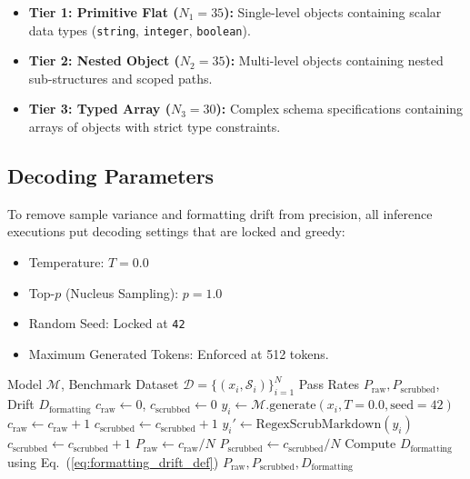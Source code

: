 \documentclass[10pt,journal,compsoc]{IEEEtran}
\begin{document}
\begin{itemize}
    \item \textbf{Tier 1: Primitive Flat ($N_1 = 35$):} Single-level objects containing scalar data types (\texttt{string}, \texttt{integer}, \texttt{boolean}).
    \item \textbf{Tier 2: Nested Object ($N_2 = 35$):} Multi-level objects containing nested sub-structures and scoped paths.
    \item \textbf{Tier 3: Typed Array ($N_3 = 30$):} Complex schema specifications containing arrays of objects with strict type constraints.
\end{itemize}

\subsection{Decoding Parameters}
To remove sample variance and formatting drift from precision, all inference executions put decoding settings that are locked and greedy:
\begin{itemize}
    \item Temperature: $T = 0.0$
    \item Top-$p$ (Nucleus Sampling): $p = 1.0$
    \item Random Seed: Locked at \texttt{42}
    \item Maximum Generated Tokens: Enforced at 512 tokens.
\end{itemize}

\begin{algorithm}[h]
\caption{Dual-Pass Dual-Verification Protocol for Formatting Drift}
\label{alg:eval_protocol}
\small
\begin{algorithmic}[1]
\REQUIRE Model $\mathcal{M}$, Benchmark Dataset $\mathcal{D} = \{(x_i, \mathcal{S}_i)\}_{i=1}^N$
\ENSURE Pass Rates $P_{\text{raw}}, P_{\text{scrubbed}}$, Drift $D_{\text{formatting}}$
\STATE $c_{\text{raw}} \leftarrow 0$, $c_{\text{scrubbed}} \leftarrow 0$
    \STATE $y_i \leftarrow \mathcal{M}.\text{generate}(x_i,\allowbreak T=0.0,\allowbreak \text{seed}=42)$
        \STATE $c_{\text{raw}} \leftarrow c_{\text{raw}} + 1$
        \STATE $c_{\text{scrubbed}} \leftarrow c_{\text{scrubbed}} + 1$
    \ELSE
        \STATE $y_i' \leftarrow \text{RegexScrubMarkdown}(y_i)$
            \STATE $c_{\text{scrubbed}} \leftarrow c_{\text{scrubbed}} + 1$
        \ENDIF
    \ENDIF
\ENDFOR
\STATE $P_{\text{raw}} \leftarrow c_{\text{raw}} / N$
\STATE $P_{\text{scrubbed}} \leftarrow c_{\text{scrubbed}} / N$
\STATE Compute $D_{\text{formatting}}$ using Eq.~(\ref{eq:formatting_drift_def})
\RETURN $P_{\text{raw}}, P_{\text{scrubbed}}, D_{\text{formatting}}$
\end{algorithmic}
\end{algorithm}
\end{document}
